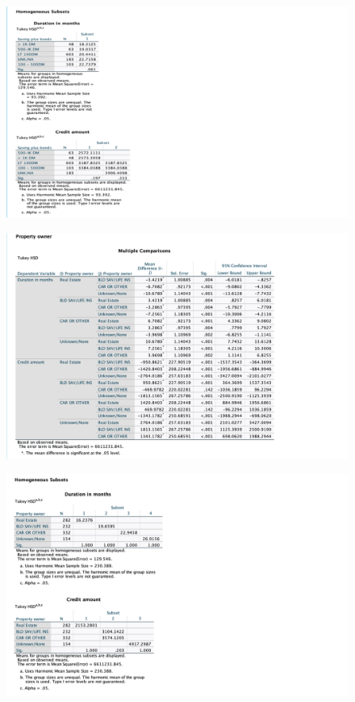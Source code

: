 \documentclass[english,10pt,a4paper]{article}
\begin{document}
	\begin{figure}[h]
		
		
		\includegraphics[width=1.2\linewidth]{post hoc test(saving plus bond)}
	\end{figure}
	
	
	\begin{figure}[h]
		
		
		\includegraphics[width=1.2\linewidth]{Multiple comparison(property owner)}
	\end{figure}
	
	\begin{figure}[h]
		
		
		\includegraphics[width=1.2\linewidth]{post hoc test(property owner)}
	\end{figure}
	
\end{document}
